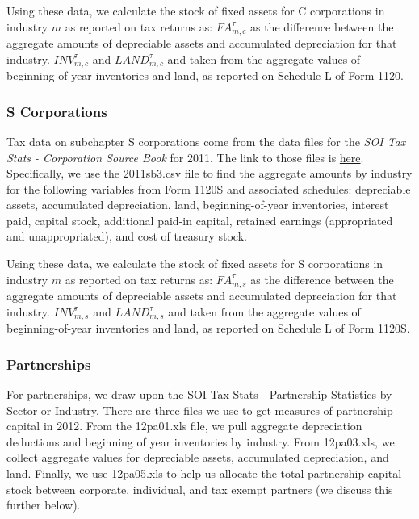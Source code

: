 \documentclass[article,11pt,letterpaper,fleqn]{article}
\theoremstyle{definition}
\numberwithin{equation}{section}
\begin{document}
Using these data, we calculate the stock of fixed assets for C corporations in industry $m$ as reported on tax returns as: ${FA}^{\tau}_{m,c}$ as the difference between the aggregate amounts of depreciable assets and accumulated depreciation for that industry.  ${INV}^{\tau}_{m,c}$ and ${LAND}^{\tau}_{m,c}$ and taken from the aggregate values of beginning-of-year inventories and land, as reported on Schedule L of Form 1120.

\subsubsection{S Corporations}

Tax data on subchapter S corporations come from the data files for the \emph{SOI Tax Stats - Corporation Source Book} for 2011.  The link to those files is \href{http://www.irs.gov/uac/SOI-Tax-Stats-Corporation-Source-Book:-Data-File}{here}.  Specifically, we use the 2011sb3.csv file to find the aggregate amounts by industry for the following variables from Form 1120S and associated schedules: depreciable assets, accumulated depreciation, land, beginning-of-year inventories, interest paid, capital stock, additional paid-in capital, retained earnings (appropriated and unappropriated), and cost of treasury stock.  

Using these data, we calculate the stock of fixed assets for S corporations in industry $m$ as reported on tax returns as: ${FA}^{\tau}_{m,s}$ as the difference between the aggregate amounts of depreciable assets and accumulated depreciation for that industry.  ${INV}^{\tau}_{m,s}$ and ${LAND}^{\tau}_{m,s}$ and taken from the aggregate values of beginning-of-year inventories and land, as reported on Schedule L of Form 1120S.

\subsubsection{Partnerships}

For partnerships, we draw upon the \href{http://www.irs.gov/uac/SOI-Tax-Stats-Partnership-Statistics-by-Sector-or-Industry}{SOI Tax Stats - Partnership Statistics by Sector or Industry}.  There are three files we use to get measures of partnership capital in 2012.  From the 12pa01.xls file, we pull aggregate depreciation deductions and beginning of year inventories by industry.  From 12pa03.xls, we collect aggregate values for depreciable assets, accumulated depreciation, and land.  Finally, we use 12pa05.xls to help us allocate the total partnership capital stock between corporate, individual, and tax exempt partners (we discuss this further below).
\end{document}

